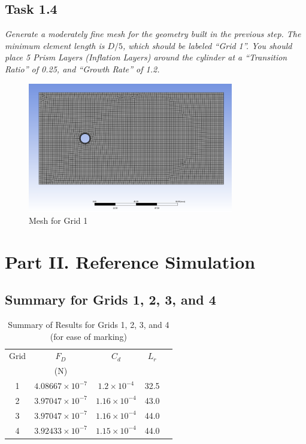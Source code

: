 \subsection*{Task 1.4}
\textit{Generate a moderately fine mesh for the geometry built in the previous step. The minimum element length is $D/5$, which should be labeled “Grid 1”. You should place 5 Prism Layers (Inflation Layers) around the cylinder at a “Transition Ratio” of 0.25, and “Growth Rate” of 1.2.}
\begin{figure}[H]
    \centering
    \includegraphics[width=0.8\textwidth]{Questions/Figures/mesh with grid 1.png}
    \caption{Mesh for Grid 1}
\end{figure}

\section*{Part II. Reference Simulation}

\subsection*{Summary for Grids 1, 2, 3, and 4}
\begin{table}[H]
    \centering
    \caption{Summary of Results for Grids 1, 2, 3, and 4 (for ease of marking)}
    \begin{tabular}{ccccc}
        \toprule
        Grid & $F_D$ & $C_d$ & $L_r$ \\ 
        & (N) & & \\
        \midrule
        1 & $4.08667 \times 10^{-7}$ & $1.2 \times 10^{-4}$ & 32.5 \\
        2 & $3.97047 \times 10^{-7}$ & $1.16 \times 10^{-4}$ & 43.0 \\
        3 & $3.97047 \times 10^{-7}$ & $1.16 \times 10^{-4}$ & 44.0 \\
        4 & $3.92433 \times 10^{-7}$ & $1.15 \times 10^{-4}$ & 44.0 \\
        \bottomrule
    \end{tabular}
\end{table}

